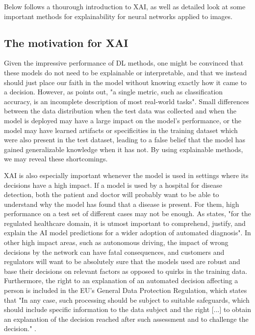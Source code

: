\documentclass[conference]{IEEEtran}
\begin{document}
Below follows a thourough introduction to XAI, as well as detailed look at some important methods for explainability for neural networks applied to images.

\subsection{The motivation for XAI}

Given the impressive performance of DL methods, one might be convinced that these models do not need to be explainable or interpretable, and that we instead should just place our faith in the model without knowing exactly how it came to a decision. However, as \cite{doshivelez} points out, "a single metric, such as classification accuracy, is an incomplete description of most real-world tasks". Small differences between the data distribution when the test data was collected and when the model is deployed may have a large impact on the model's performance, or the model may have learned artifacts or specificities in the training dataset which were also present in the test dataset, leading to a false belief that the model has gained generalizable knowledge when it has not. By using explainable methods, we may reveal these shortcomings.

XAI is also especially important whenever the model is used in settings where its decisions have a high impact. If a model is used by a hospital for disease detection, both the patient and doctor will probably want to be able to understand why the model has found that a disease is present. For them, high performance on a test set of different cases may not be enough. As \cite{xaisurvey} states, "for the regulated healthcare domain, it is utmost important to comprehend, justify, and explain the AI model predictions for a wider adoption of automated diagnosis". In other high impact areas, such as autonomous driving, the impact of wrong decisions by the network can have fatal consequences, and customers and regulators will want to be absolutely sure that the models used are robust and base their decisions on relevant factors as opposed to quirks in the training data. Furthermore, the right to an explanation of an automated decision affecting a person is included in the EU's General Data Protection Regulation, which states that "In any case, such processing should be subject to suitable safeguards, which should include specific information to the data subject and the right [...] to obtain an explanation of the decision reached after such assessment and to challenge the decision." \cite{gdpr}.
\end{document}
